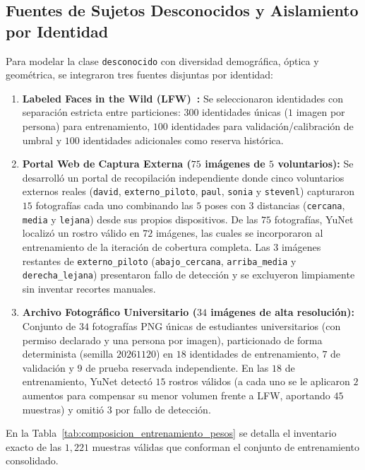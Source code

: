 \documentclass{article}
\begin{document}
\subsection{Fuentes de Sujetos Desconocidos y Aislamiento por Identidad}
Para modelar la clase \texttt{desconocido} con diversidad demográfica, óptica y geométrica, se integraron tres fuentes disjuntas por identidad:
\begin{enumerate}
    \item \textbf{Labeled Faces in the Wild (LFW)~\cite{huang2007lfw}:} Se seleccionaron identidades con separación estricta entre particiones: $300$ identidades únicas ($1$ imagen por persona) para entrenamiento, $100$ identidades para validación/calibración de umbral y $100$ identidades adicionales como reserva histórica.
    \item \textbf{Portal Web de Captura Externa ($75$ imágenes de $5$ voluntarios):} Se desarrolló un portal de recopilación independiente donde cinco voluntarios externos reales (\texttt{david}, \texttt{externo\_piloto}, \texttt{paul}, \texttt{sonia} y \texttt{stevenl}) capturaron $15$ fotografías cada uno combinando las $5$ poses con $3$ distancias (\texttt{cercana}, \texttt{media} y \texttt{lejana}) desde sus propios dispositivos. De las $75$ fotografías, YuNet localizó un rostro válido en $72$ imágenes, las cuales se incorporaron al entrenamiento de la iteración de cobertura completa. Las $3$ imágenes restantes de \texttt{externo\_piloto} (\texttt{abajo\_cercana}, \texttt{arriba\_media} y \texttt{derecha\_lejana}) presentaron fallo de detección y se excluyeron limpiamente sin inventar recortes manuales.
    \item \textbf{Archivo Fotográfico Universitario ($34$ imágenes de alta resolución):} Conjunto de $34$ fotografías PNG únicas de estudiantes universitarios (con permiso declarado y una persona por imagen), particionado de forma determinista (semilla $20261120$) en $18$ identidades de entrenamiento, $7$ de validación y $9$ de prueba reservada independiente. En las $18$ de entrenamiento, YuNet detectó $15$ rostros válidos (a cada uno se le aplicaron $2$ aumentos para compensar su menor volumen frente a LFW, aportando $45$ muestras) y omitió $3$ por fallo de detección.
\end{enumerate}

En la Tabla~\ref{tab:composicion_entrenamiento_pesos} se detalla el inventario exacto de las $1,221$ muestras válidas que conforman el conjunto de entrenamiento consolidado.
\end{document}

